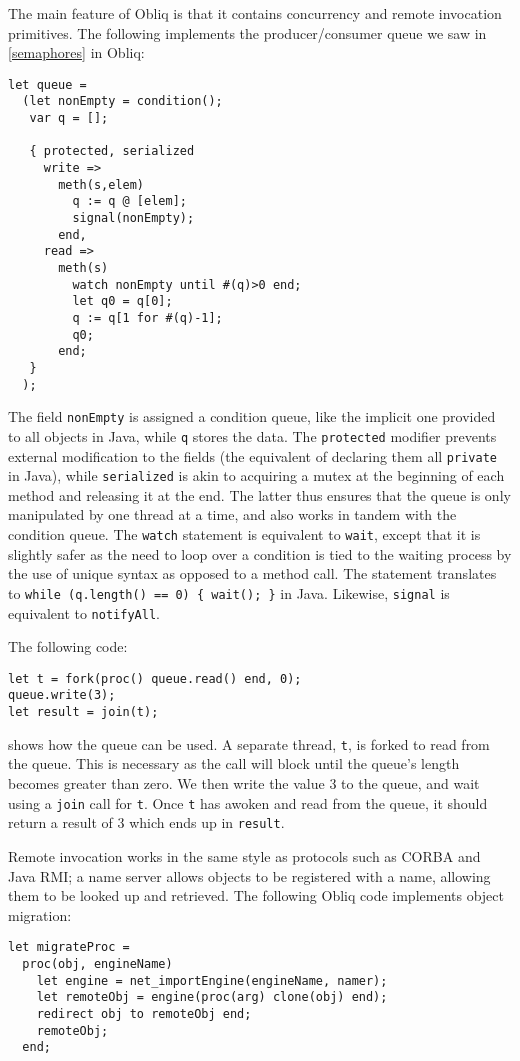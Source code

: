 The main feature of Obliq is that it contains concurrency and remote
invocation primitives.  The following implements the producer/consumer
queue we saw in \ref{semaphores} in Obliq:
\begin{verbatim}
let queue =
  (let nonEmpty = condition();
   var q = [];

   { protected, serialized
     write =>
       meth(s,elem)
         q := q @ [elem];
         signal(nonEmpty);
       end,
     read =>
       meth(s)
         watch nonEmpty until #(q)>0 end;
         let q0 = q[0];
         q := q[1 for #(q)-1];
         q0;
       end;
   }
  );
\end{verbatim}
The field \texttt{nonEmpty} is assigned a condition queue, like the
implicit one provided to all objects in Java, while \texttt{q} stores
the data.  The \texttt{protected} modifier prevents external
modification to the fields (the equivalent of declaring them all
\texttt{private} in Java), while \texttt{serialized} is akin to
acquiring a mutex at the beginning of each method and releasing it at
the end.  The latter thus ensures that the queue is only manipulated
by one thread at a time, and also works in tandem with the condition
queue.  The \texttt{watch} statement is equivalent to \texttt{wait},
except that it is slightly safer as the need to loop over a condition
is tied to the waiting process by the use of unique syntax as opposed
to a method call.  The statement translates to \texttt{while
  (q.length() == 0) \{ wait(); \}} in Java.  Likewise, \texttt{signal}
is equivalent to \texttt{notifyAll}.

The following code:
\begin{verbatim}
let t = fork(proc() queue.read() end, 0);
queue.write(3);
let result = join(t);
\end{verbatim}
shows how the queue can be used.  A separate thread, \texttt{t}, is
forked to read from the queue.  This is necessary as the call will
block until the queue's length becomes greater than zero.  We then
write the value 3 to the queue, and wait using a \texttt{join} call
for \texttt{t}. Once \texttt{t} has awoken and read from the queue, it
should return a result of 3 which ends up in \texttt{result}.

Remote invocation works in the same style as protocols such as CORBA
and Java RMI; a name server allows objects to be registered with a
name, allowing them to be looked up and retrieved.  The following
Obliq code implements object migration:

\begin{verbatim}
let migrateProc =
  proc(obj, engineName)
    let engine = net_importEngine(engineName, namer);
    let remoteObj = engine(proc(arg) clone(obj) end);
    redirect obj to remoteObj end;
    remoteObj;
  end;
\end{verbatim}

